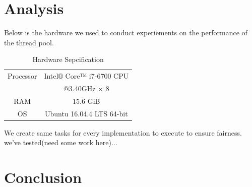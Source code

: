 \documentclass[journal, a4paper]{IEEEtran}
\begin{document}
\section{Analysis}
Below is the hardware we used to conduct experiements on the performance of the thread pool.
	\begin{table}[!hbt]
	\begin{center}
		\caption{Hardware Sepcification}
		\label{tab:simParameters}
		\begin{tabular}{|c|c|}
			\hline
			Processor & Intel® Core™ i7-6700 CPU \\
								&@3.40GHz $\times$ 8\\
			\hline
			RAM & $15.6$ GiB \\
			\hline
			OS & Ubuntu 16.04.4 LTS 64-bit\\
			\hline
		\end{tabular}
		\end{center}
	\end{table}

We create same tasks for every implementation to execute to ensure fairness. we've tested(need some work here)...

\section{Conclusion}

\end{document}
